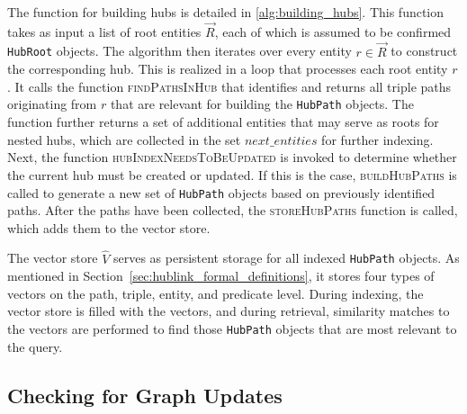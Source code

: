 The function for building hubs is detailed in \autoref{alg:building_hubs}. This function takes as input a list of root entities \(\vec{R}\), each of which is assumed to be confirmed \texttt{HubRoot} objects. The algorithm then iterates over every entity \(r \in \vec{R}\) to construct the corresponding hub. This is realized in a loop that processes each root entity \(r\). It calls the function \textsc{findPathsInHub} that identifies and returns all triple paths originating from \(r\) that are relevant for building the \texttt{HubPath} objects. The function further returns a set of additional entities that may serve as roots for nested hubs, which are collected in the set \(next\_entities\) for further indexing. Next, the function \textsc{hubIndexNeedsToBeUpdated} is invoked to determine whether the current hub must be created or updated. If this is the case, \textsc{buildHubPaths} is called to generate a new set of \texttt{HubPath} objects based on previously identified paths. After the paths have been collected, the \textsc{storeHubPaths} function is called, which adds them to the vector store.

\begin{tcolorbox}[title=Persistent Storage: Vector Store \(\hat{V}\)]
The vector store \(\hat{V}\) serves as persistent storage for all indexed \texttt{HubPath} objects. As mentioned in Section~\ref{sec:hublink_formal_definitions}, it stores four types of vectors on the path, triple, entity, and predicate level. During indexing, the vector store is filled with the vectors, and during retrieval, similarity matches to the vectors are performed to find those \texttt{HubPath} objects that are most relevant to the query.
\end{tcolorbox}

\subsection{Checking for Graph Updates}

